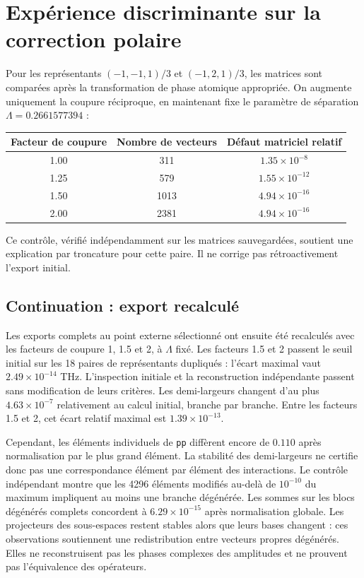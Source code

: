 \documentclass[11pt,a4paper]{article}
\begin{document}
\section{Expérience discriminante sur la correction polaire}
Pour les représentants $(-1,-1,1)/3$ et $(-1,2,1)/3$, les matrices sont
comparées après la transformation de phase atomique appropriée.
On augmente uniquement la coupure réciproque, en maintenant
fixe le paramètre de séparation $\Lambda=0.2661577394$ :
\begin{center}
\begin{tabular}{ccc}
\toprule
Facteur de coupure & Nombre de vecteurs & Défaut matriciel relatif\\
\midrule
1.00 & 311 & $1.35\times10^{-8}$\\
1.25 & 579 & $1.55\times10^{-12}$\\
1.50 & 1013 & $4.94\times10^{-16}$\\
2.00 & 2381 & $4.94\times10^{-16}$\\
\bottomrule
\end{tabular}
\end{center}
Ce contrôle, vérifié indépendamment sur les matrices sauvegardées,
soutient une explication par troncature pour cette paire.
Il ne corrige pas rétroactivement l'export initial.

\subsection{Continuation : export recalculé}
Les exports complets au point externe sélectionné ont ensuite été
recalculés avec les facteurs de coupure 1, 1.5 et 2, à $\Lambda$ fixé.
Les facteurs 1.5 et 2 passent le seuil initial sur les 18 paires de
représentants dupliqués : l'écart maximal vaut $2.49\times10^{-14}$ THz.
L'inspection initiale et la reconstruction indépendante passent sans
modification de leurs critères.
Les demi-largeurs changent d'au plus $4.63\times10^{-7}$ relativement
au calcul initial, branche par branche. Entre les facteurs 1.5 et 2,
cet écart relatif maximal est $1.39\times10^{-13}$.

Cependant, les éléments individuels de \texttt{pp} diffèrent encore
de $0.110$ après normalisation par le plus grand élément.
La stabilité des demi-largeurs ne certifie donc pas une correspondance
élément par élément des interactions. Le contrôle indépendant montre que les 4296 éléments modifiés au-delà
de $10^{-10}$ du maximum impliquent au moins une branche dégénérée.
Les sommes sur les blocs dégénérés complets concordent à
$6.29\times10^{-15}$ après normalisation globale.
Les projecteurs des sous-espaces restent stables alors que leurs bases
changent : ces observations soutiennent une redistribution entre
vecteurs propres dégénérés. Elles ne reconstruisent pas les phases
complexes des amplitudes et ne prouvent pas l'équivalence des opérateurs.
\end{document}
